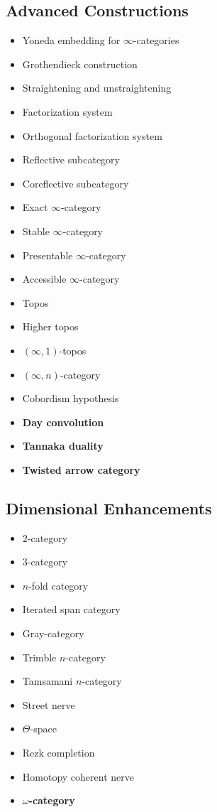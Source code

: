 \subsection{Advanced Constructions}

\begin{itemize}
\item Yoneda embedding for $\infty$-categories
\item Grothendieck construction
\item Straightening and unstraightening
\item Factorization system
\item Orthogonal factorization system
\item Reflective subcategory
\item Coreflective subcategory
\item Exact $\infty$-category
\item Stable $\infty$-category
\item Presentable $\infty$-category
\item Accessible $\infty$-category
\item Topos
\item Higher topos
\item $(\infty,1)$-topos
\item $(\infty,n)$-category
\item Cobordism hypothesis
\item \textbf{Day convolution}
\item \textbf{Tannaka duality}
\item \textbf{Twisted arrow category}
\end{itemize}

\subsection{Dimensional Enhancements}

\begin{itemize}
\item $2$-category
\item $3$-category
\item $n$-fold category
\item Iterated span category
\item Gray-category
\item Trimble $n$-category
\item Tamsamani $n$-category
\item Street nerve
\item $\Theta$-space
\item Rezk completion
\item Homotopy coherent nerve
\item \textbf{$\omega$-category}
\end{itemize}

